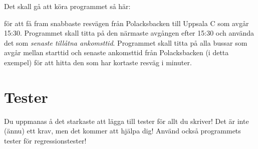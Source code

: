 Det skall gå att köra programmet så här\+:




för att få fram snabbaste resvägen från Polacksbacken till Uppsala C som avgår 15\+:30. Programmet skall titta på den närmaste avgången efter 15\+:30 och använda det som {\itshape senaste tillåtna ankomsttid}. Programmet skall titta på alla bussar som avgår mellan starttid och senaste ankomsttid från Polacksbacken (i detta exempel) för att hitta den som har kortaste resväg i minuter.

\section*{Tester}

Du uppmanas å det starkaste att lägga till tester för allt du skriver! Det är inte (ännu) ett krav, men det kommer att hjälpa dig! Använd också programmets tester för regressionstester! 